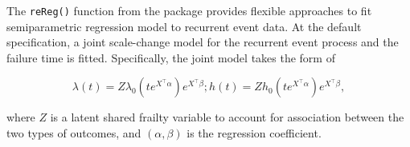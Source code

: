 The \texttt{reReg()} function from the  package provides
flexible approaches to fit semiparametric regression model to recurrent
event data. At the default specification, a joint scale-change model for
the recurrent event process and the failure time is fitted.
Specifically, the joint model takes the form of

\begin{equation}
\lambda(t) = Z \lambda_0(te^{X^\top\alpha})e^{X^\top\beta};
h(t) = Z h_0(te^{X^\top\alpha})e^{X^\top\beta},
\end{equation}

where \(Z\) is a latent shared frailty variable to account for
association between the two types of outcomes, and \((\alpha, \beta)\)
is the regression coefficient.
